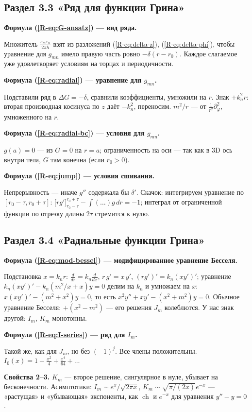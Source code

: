 \documentclass[a4paper,12pt]{article}
\newcommand{\rf}[1]{(\ref*{R-#1})}
\newcommand{\fhead}[2]{\par\medskip\textbf{Формула #1 — #2.}\par\nopagebreak[4]}
\begin{document}
\subsection{Раздел 3.3 «Ряд для функции Грина»}

\fhead{\rf{eq:G-ansatz}}{вид ряда}
Множитель $\frac{\varepsilon_m\varepsilon_n}{2\pi h}$ взят из разложений
\rf{eq:delta-z}, \rf{eq:delta-phi}, чтобы уравнение для $g_{mn}$ имело
правую часть ровно $-\delta(r-r_0)$. Каждое слагаемое уже удовлетворяет
условиям на торцах и периодичности.

\fhead{\rf{eq:radial}}{уравнение для $g_{mn}$}
Подставили ряд в $\Delta G=-\delta$, сравнили коэффициенты, умножили на
$r$. Знак $+k_n^2r$: вторая производная косинуса по $z$ даёт $-k_n^2$,
переносим. $m^2/r$ — от $\frac{1}{r^2}\partial^2_\varphi$, умноженного
на $r$.

\fhead{\rf{eq:radial-bc}}{условия для $g_{mn}$}
$g(a)=0$ — из $G=0$ на $r=a$; ограниченность на оси — так как в 3D ось
внутри тела, $G$ там конечна (если $r_0>0$).

\fhead{\rf{eq:jump}}{условия сшивания}
Непрерывность — иначе $g''$ содержала бы $\delta'$. Скачок: интегрируем
уравнение по $[r_0-\tau,r_0+\tau]$:
$\bigl[rg'\bigr]_{r_0-\tau}^{r_0+\tau}-\int(\dots)g\,dr=-1$; интеграл
от ограниченной функции по отрезку длины $2\tau$ стремится к нулю.

\subsection{Раздел 3.4 «Радиальные функции Грина»}

\fhead{\rf{eq:mod-bessel}}{модифицированное уравнение Бесселя}
Подстановка $x=k_nr$: $\frac{d}{dr}=k_n\frac{d}{dx}$, $r\,g'=x\,y'$,
$(rg')'=k_n(xy')'$; уравнение $k_n(xy')'-k_n(m^2/x+x)y=0$ делим на $k_n$
и умножаем на $x$: $x(xy')'-(m^2+x^2)y=0$, то есть
$x^2y''+xy'-(x^2+m^2)y=0$. Обычное
уравнение Бесселя: $+(x^2-m^2)$ — его решения $J_m$ колеблются.
У нас знак другой: $I_m$, $K_m$ монотонны.

\fhead{\rf{eq:I-series}}{ряд для $I_m$}
Такой же, как для $J_m$, но без $(-1)^j$. Все члены положительны.
$I_0(x)=1+\frac{x^2}{4}+\frac{x^4}{64}+\dots$

\textbf{Свойства 2–3.} $K_m$ — второе решение, сингулярное в нуле, убывает
на бесконечности. Асимптотики: $I_m\sim e^x/\sqrt{2\pi x}$,
$K_m\sim\sqrt{\pi/(2x)}e^{-x}$ — «растущая» и «убывающая» экспоненты,
как $\operatorname{ch}$ и $e^{-x}$ для уравнения $y''-y=0$.
\end{document}
